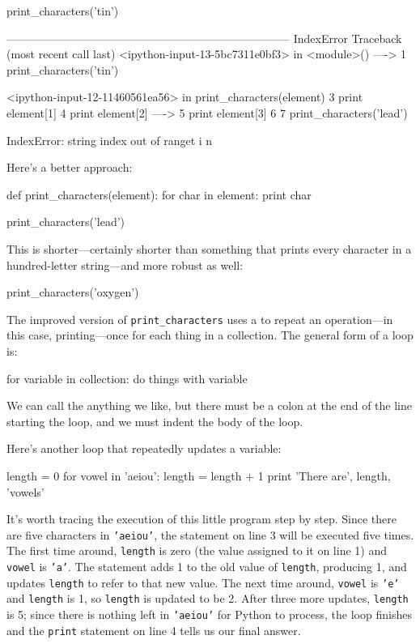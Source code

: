 \begin{VerbIn}
print_characters('tin')
\end{VerbIn}

\begin{VerbErr}
---------------------------------------------------------------------------
IndexError                                Traceback (most recent call last)
<ipython-input-13-5bc7311e0bf3> in <module>()
----> 1 print_characters('tin')

<ipython-input-12-11460561ea56> in print_characters(element)
      3     print element[1]
      4     print element[2]
----> 5     print element[3]
      6
      7 print_characters('lead')

IndexError: string index out of ranget
i
n
\end{VerbErr}

Here's a better approach:

\begin{VerbIn}
def print_characters(element):
    for char in element:
        print char

print_characters('lead')
\end{VerbIn}

This is shorter---certainly shorter than something that prints every
character in a hundred-letter string---and more robust as well:

\begin{VerbIn}
print_characters('oxygen')
\end{VerbIn}

The improved version of \texttt{print\_characters} uses a
 to repeat an operation---in this case,
printing---once for each thing in a collection. The general form of a
loop is:

\begin{VerbIn}
for variable in collection:
    do things with variable
\end{VerbIn}

We can call the  anything we
like, but there must be a colon at the end of the line starting the
loop, and we must indent the body of the loop.

Here's another loop that repeatedly updates a variable:

\begin{VerbIn}
length = 0
for vowel in 'aeiou':
    length = length + 1
print 'There are', length, 'vowels'
\end{VerbIn}

It's worth tracing the execution of this little program step by step.
Since there are five characters in \texttt{'aeiou'}, the statement on
line 3 will be executed five times. The first time around,
\texttt{length} is zero (the value assigned to it on line 1) and
\texttt{vowel} is \texttt{'a'}. The statement adds 1 to the old value of
\texttt{length}, producing 1, and updates \texttt{length} to refer to
that new value. The next time around, \texttt{vowel} is \texttt{'e'} and
\texttt{length} is 1, so \texttt{length} is updated to be 2. After three
more updates, \texttt{length} is 5; since there is nothing left in
\texttt{'aeiou'} for Python to process, the loop finishes and the
\texttt{print} statement on line 4 tells us our final answer.

